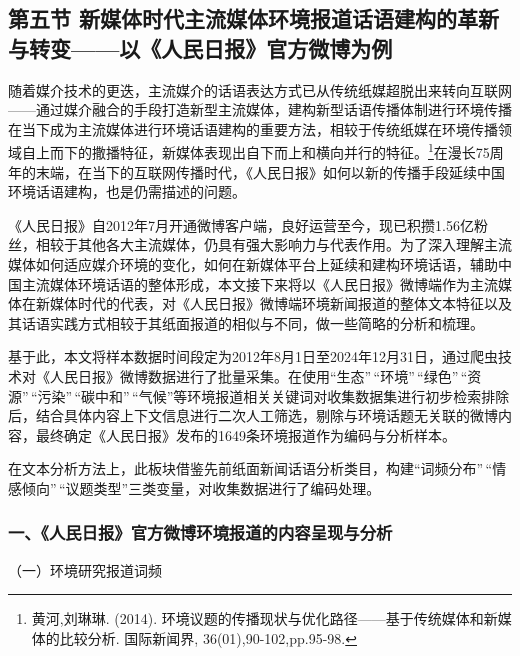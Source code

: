 \subsection{第五节
新媒体时代主流媒体环境报道话语建构的革新与转变------以《人民日报》官方微博为例}\label{ux7b2cux4e94ux8282-ux65b0ux5a92ux4f53ux65f6ux4ee3ux4e3bux6d41ux5a92ux4f53ux73afux5883ux62a5ux9053ux8bddux8bedux5efaux6784ux7684ux9769ux65b0ux4e0eux8f6cux53d8ux4ee5ux4ebaux6c11ux65e5ux62a5ux5b98ux65b9ux5faeux535aux4e3aux4f8b}

随着媒介技术的更迭，主流媒介的话语表达方式已从传统纸媒超脱出来转向互联网------通过媒介融合的手段打造新型主流媒体，建构新型话语传播体制进行环境传播在当下成为主流媒体进行环境话语建构的重要方法，相较于传统纸媒在环境传播领域自上而下的撒播特征，新媒体表现出自下而上和横向并行的特征。\footnote{黄河,刘琳琳.
  (2014).
  环境议题的传播现状与优化路径------基于传统媒体和新媒体的比较分析.
  国际新闻界, 36(01),90-102,pp.95-98.}在漫长75周年的末端，在当下的互联网传播时代，《人民日报》如何以新的传播手段延续中国环境话语建构，也是仍需描述的问题。

《人民日报》自2012年7月开通微博客户端，良好运营至今，现已积攒1.56亿粉丝，相较于其他各大主流媒体，仍具有强大影响力与代表作用。为了深入理解主流媒体如何适应媒介环境的变化，如何在新媒体平台上延续和建构环境话语，辅助中国主流媒体环境话语的整体形成，本文接下来将以《人民日报》微博端作为主流媒体在新媒体时代的代表，对《人民日报》微博端环境新闻报道的整体文本特征以及其话语实践方式相较于其纸面报道的相似与不同，做一些简略的分析和梳理。

基于此，本文将样本数据时间段定为2012年8月1日至2024年12月31日，通过爬虫技术对《人民日报》微博数据进行了批量采集。在使用``生态''\,``环境''\,``绿色''\,``资源''\,``污染''\,``碳中和''\,``气候''等环境报道相关关键词对收集数据集进行初步检索排除后，结合具体内容上下文信息进行二次人工筛选，剔除与环境话题无关联的微博内容，最终确定《人民日报》发布的1649条环境报道作为编码与分析样本。

在文本分析方法上，此板块借鉴先前纸面新闻话语分析类目，构建``词频分布''\,``情感倾向''\,``议题类型''三类变量，对收集数据进行了编码处理。

\subsubsection{一、《人民日报》官方微博环境报道的内容呈现与分析}\label{ux4e00ux4ebaux6c11ux65e5ux62a5ux5b98ux65b9ux5faeux535aux73afux5883ux62a5ux9053ux7684ux5185ux5bb9ux5448ux73b0ux4e0eux5206ux6790}

（一）环境研究报道词频

